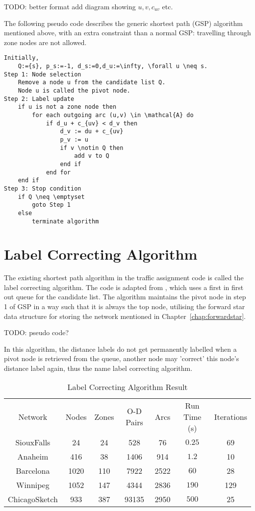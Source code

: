 {
    TODO: better format
    add diagram showing $u, v, c_{uv}$ etc.
}

The following pseudo code describes the generic shortest path (GSP) algorithm mentioned above,
with an extra constraint than a normal GSP: travelling through zone nodes are not allowed.
\begin{verbatim}
Initially,
    Q:={s}, p_s:=-1, d_s:=0,d_u:=\infty, \forall u \neq s.
Step 1: Node selection
    Remove a node u from the candidate list Q.
    Node u is called the pivot node.
Step 2: Label update
    if u is not a zone node then
        for each outgoing arc (u,v) \in \mathcal{A} do
            if d_u + c_{uv} < d_v then
                d_v := du + c_{uv}
                p_v := u
                if v \notin Q then
                    add v to Q
                end if
            end for
    end if
Step 3: Stop condition
    if Q \neq \emptyset
        goto Step 1
    else
        terminate algorithm
\end{verbatim}

\section{Label Correcting Algorithm}
The existing shortest path algorithm in the traffic assignment code is called the label correcting algorithm.
The code is adapted from \citep{Sheffi}, 
which uses a first in first out queue for the candidate list.
The algorithm maintains the pivot node in step 1 of GSP in a way such that it is always the top node,
utilising the forward star data structure for storing the network mentioned in Chapter~\ref{chap:forwardstar}.

{
    TODO: pseudo code?
}

In this algorithm,
the distance labels do not get permanently labelled when a pivot node is retrieved from the queue,
another node may 'correct' this node's distance label again,
thus the name label correcting algorithm.

\begin{table}[H]
    \centering
    \begin{tabular}{ccccccc}
        Network & Nodes & Zones & O-D Pairs & Arcs & Run Time (s) & Iterations \\
        SiouxFalls    & 24   & 24  & 528   & 76   & $ 0.25 $ & 69 \\
        Anaheim       & 416  & 38  & 1406  & 914  & $ 1.2  $ & 10 \\
        Barcelona     & 1020 & 110 & 7922  & 2522 & $ 60   $ & 28 \\
        Winnipeg      & 1052 & 147 & 4344  & 2836 & $ 190  $ & 129 \\
        ChicagoSketch & 933  & 387 & 93135 & 2950 & $ 500  $ & 25 
    \end{tabular}
    \caption{Label Correcting Algorithm Result}
\end{table}

